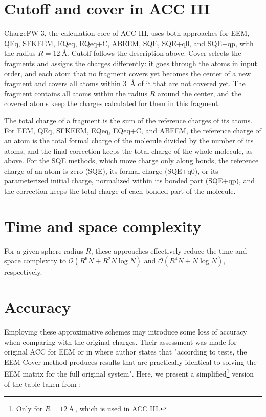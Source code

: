 \documentclass[oneside]{memoir}
\begin{document}
\section*{Cutoff and cover in ACC III}

ChargeFW 3, the calculation core of ACC III, uses both approaches for EEM, QEq, SFKEEM, EQeq, EQeq+C, ABEEM, SQE, SQE+q0, and SQE+qp, with the radius $R = 12~$\AA. Cutoff follows the description above. Cover selects the fragments and assigns the charges differently: it goes through the atoms in input order, and each atom that no fragment covers yet becomes the center of a new fragment and covers all atoms within 3~\AA{} of it that are not covered yet. The fragment contains all atoms within the radius $R$ around the center, and the covered atoms keep the charges calculated for them in this fragment.

The total charge of a fragment is the sum of the reference charges of its atoms. For EEM, QEq, SFKEEM, EQeq, EQeq+C, and ABEEM, the reference charge of an atom is the total formal charge of the molecule divided by the number of its atoms, and the final correction keeps the total charge of the whole molecule, as above. For the SQE methods, which move charge only along bonds, the reference charge of an atom is zero (SQE), its formal charge (SQE+q0), or its parameterized initial charge, normalized within its bonded part (SQE+qp), and the correction keeps the total charge of each bonded part of the molecule.

\section*{Time and space complexity}

For a given sphere radius $R$, these approaches effectively reduce the time and space complexity to ${\mathcal O}(R^6N + R^2N\log N)$ and ${\mathcal O}(R^4N + N\log N)$, respectively. \cite{Ionescu2015}

\section*{Accuracy}

Employing these approximative schemes may introduce some loss of accuracy when comparing with the original charges. Their assessment was made for original ACC for EEM \cite{Ionescu2015} or in \cite{Sehnal2015} where author states that "according to tests, the EEM Cover method produces results that are practically identical to solving the EEM matrix for the full original system". Here, we present a simplified\footnote{Only for $R = 12~$\AA\,, which is used in ACC III.} version of the table taken from \cite{Sehnal2015}:
\end{document}
